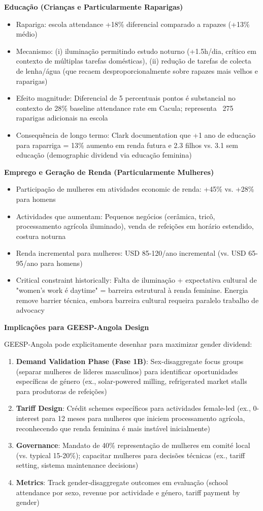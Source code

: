\documentclass[12pt, a4paper]{article}
\begin{document}
\textbf{Educação (Crianças e Particularmente Raparigas)}
\begin{itemize}
\item Rapariga: escola attendance +18\% diferencial comparado a rapazes (+13\% médio)
\item Mecanismo: (i) iluminação permitindo estudo noturno (+1.5h/dia, crítico em contexto de múltiplas tarefas domésticas), (ii) redução de tarefas de colecta de lenha/água (que recaem desproporcionalmente sobre rapazes mais velhos e raparigas)
\item Efeito magnitude: Diferencial de 5 percentuais pontos é substancial no contexto de 28\% baseline attendance rate em Cacula; representa ~275 raparigas adicionais na escola
\item Consequência de longo termo: Clark documentation que +1 ano de educação para raparriga = 13\% aumento em renda futura e 2.3 filhos vs. 3.1 sem educação (demographic dividend via educação feminina)
\end{itemize}

\textbf{Emprego e Geração de Renda (Particularmente Mulheres)}
\begin{itemize}
\item Participação de mulheres em atividades economic de renda: +45\% vs. +28\% para homens
\item Actividades que aumentam: Pequenos negócios (cerâmica, tricô, processamento agrícola iluminado), venda de refeições em horário estendido, costura noturna
\item Renda incremental para mulheres: USD 85-120/ano incremental (vs. USD 65-95/ano para homens)
\item Critical constraint historically: Falta de iluminação + expectativa cultural de "women's work é daytime" = barreira estrutural à renda feminine. Energia remove barrier técnica, embora barreira cultural requeira paralelo trabalho de advocacy
\end{itemize}

\textbf{Implicações para GEESP-Angola Design}

GEESP-Angola pode explicitamente desenhar para maximizar gender dividend:
\begin{enumerate}
\item \textbf{Demand Validation Phase (Fase 1B)}: Sex-disaggregate focus groups (separar mulheres de líderes masculinos) para identificar oportunidades específicas de género (ex., solar-powered milling, refrigerated market stalls para produtoras de refeições)
\item \textbf{Tariff Design}: Crédit schemes específicos para actividades female-led (ex., 0-interest para 12 meses para mulheres que iniciem processamento agrícola, reconhecendo que renda feminina é mais instável inicialmente)
\item \textbf{Governance}: Mandato de 40\% representação de mulheres em comité local (vs. typical 15-20\%); capacitar mulheres para decisões técnicas (ex., tariff setting, sistema maintenance decisions)
\item \textbf{Metrics}: Track gender-disaggregate outcomes em evaluação (school attendance por sexo, revenue por actividade e género, tariff payment by gender)
\end{enumerate}
\end{document}
